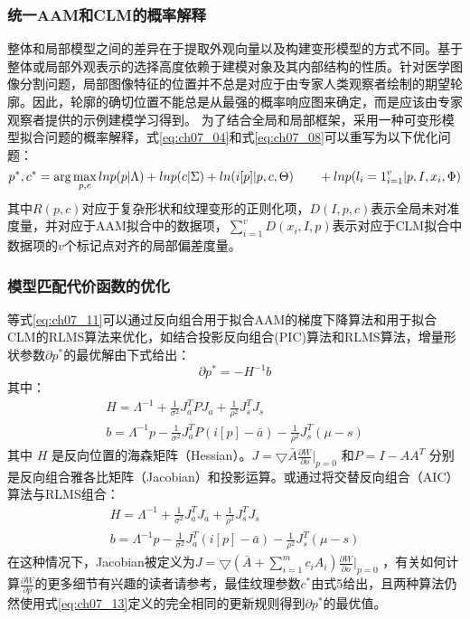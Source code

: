 \subsubsection{统一AAM和CLM的概率解释}
整体和局部模型之间的差异在于提取外观向量以及构建变形模型的方式不同。基于整体或局部外观表示的选择高度依赖于建模对象及其内部结构的性质。针对医学图像分割问题，局部图像特征的位置并不总是对应于由专家人类观察者绘制的期望轮廓。因此，轮廓的确切位置不能总是从最强的概率响应图来确定，而是应该由专家观察者提供的示例建模学习得到。
为了结合全局和局部框架，采用一种可变形模型拟合问题的概率解释，式\ref{eq:ch07_04}和式\ref{eq:ch07_08}可以重写为以下优化问题：
\begin{equation}\label{eq:ch07_11}
    p^*,c^*=\arg \max_{p,c}{ lnp(p|\Lambda)+lnp(c|\Sigma)+ln(i[p]|p,c,\Theta)\\
   \qquad + ln p({l_i=1}_{i=1}^v|p,I,x_i,\Phi) }
 \end{equation} 
其中$R(p,c)$对应于复杂形状和纹理变形的正则化项，$D(I,p,c)$表示全局未对准度量，并对应于AAM拟合中的数据项，$\sum_{i=1}^vD(x_i,I,p)$表示对应于CLM拟合中数据项的$v$个标记点对齐的局部偏差度量。 

\subsubsection{模型匹配代价函数的优化} 

等式\ref{eq:ch07_11}可以通过反向组合用于拟合AAM的梯度下降算法和用于拟合CLM的RLMS算法来优化，如结合投影反向组合(PIC)算法\citep{Jan2017}和RLMS算法，增量形状参数$\partial p^*$的最优解由下式给出：
\begin{equation}\label{eq:ch07_12}
    \partial p^*= -H^{-1}b
 \end{equation}         
其中：
\begin{equation}\label{eq:ch07_13}
    \begin{aligned}
        H=\Lambda ^{-1}+\frac{1}{\sigma ^2}J_a^TPJ_a+\frac{1}{\rho ^2}J_s^TJ_s\\
        b= \Lambda ^{-1}p-\frac{1}{\sigma ^2}J_a^TP(i[p]-\bar{a})-\frac{1}{\rho ^2}J_s^T(\mu -s)
    \end{aligned}
\end{equation} 
其中 $H$ 是反向位置的海森矩阵（Hessian）。$J=\bigtriangledown \bar A\frac{\partial W}{\partial o}|_{p=0}$ 和$P=I-AA^T$ 分别是反向组合雅各比矩阵（Jacobian）和投影运算。或通过将交替反向组合（AIC）算法\citep{Jan2017}与RLMS组合：
\begin{equation}\label{eq:ch07_14}
    \begin{aligned}
        H=\Lambda ^{-1}+\frac{1}{\sigma ^2}J_a^TJ_a+\frac{1}{\rho ^2}J_s^TJ_s\\
        b= \Lambda ^{-1}p-\frac{1}{\sigma ^2}J_a^T(i[p]-\bar{a})-\frac{1}{\rho ^2}J_s^T(\mu -s)
    \end{aligned}
 \end{equation} 
在这种情况下，Jacobian被定义为$J=\bigtriangledown (\bar A+\sum_{i=1}^m c_iA_i)\frac{\partial W}{\partial o}|_{p=0}$ ，有关如何计算$\frac{\partial W}{\partial p}$的更多细节有兴趣的读者请参考\citep{Jan2017}，最佳纹理参数$c^*$由式5给出，且两种算法仍然使用式\ref{eq:ch07_13}定义的完全相同的更新规则得到$\partial p^*$的最优值。

